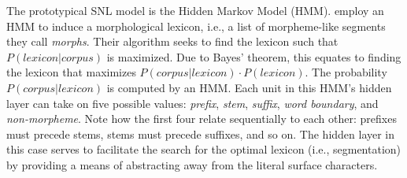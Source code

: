 The prototypical SNL model is the Hidden Markov Model (HMM). 
\cite{creutz-and-lagus:2005, creutz-and-lagus:2007} employ an HMM to induce a morphological lexicon, i.e., a list of morpheme-like segments they call \textit{morphs}. 
Their algorithm seeks to find the lexicon such that $P(lexicon|corpus)$ is maximized. Due to Bayes' theorem, this equates to finding the lexicon that maximizes $P(corpus|lexicon) \cdot P(lexicon)$. The probability $P(corpus|lexicon)$ is computed by an HMM. Each unit in this HMM's hidden layer can take on five possible values: \textit{prefix}, \textit{stem}, \textit{suffix}, \textit{word boundary}, and \textit{non-morpheme}. 
Note how the first four relate sequentially to each other: prefixes must precede stems, stems must precede suffixes, and so on.
The hidden layer in this case serves to facilitate the search for the optimal lexicon 
(i.e., segmentation) by providing a means of abstracting away from the literal surface characters.

